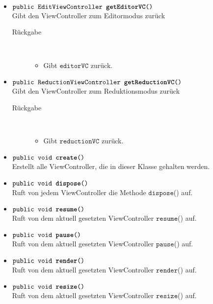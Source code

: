 \begin{description}
\begin{itemize}
		\item $\texttt{public EditViewController \textbf{getEditorVC}()}$ \\ Gibt den ViewController zum Editormodus zurück
			\begin{description}
			\item[Rückgabe] \hfill \\
			\vspace{-.8cm}
			\begin{itemize}
				\item Gibt $\texttt{editorVC}$ zurück.
			\end{itemize}
		\end{description}
		
		\item $\texttt{public ReductionViewController \textbf{getReductionVC}()}$ \\ Gibt den ViewController zum Reduktionsmodus zurück
			\begin{description}
			\item[Rückgabe] \hfill \\
			\vspace{-.8cm}
			\begin{itemize}
				\item Gibt $\texttt{reductionVC}$ zurück.
			\end{itemize}
		\end{description}

		\item $\texttt{public void \textbf{create}()}$ \\ Erstellt alle ViewController, die in dieser Klasse gehalten werden.
		\item $\texttt{public void \textbf{dispose}()}$ \\ Ruft von jedem ViewController die Methode $\texttt{dispose}$() auf.
		\item $\texttt{public void \textbf{resume}()}$ \\ Ruft von dem aktuell gesetzten ViewController $\texttt{resume}$() auf.
		\item $\texttt{public void \textbf{pause}()}$ \\ Ruft von dem aktuell gesetzten ViewController $\texttt{pause}$() auf.
		\item $\texttt{public void \textbf{render}()}$ \\ Ruft von dem aktuell gesetzten ViewController $\texttt{render}$() auf.
		\item $\texttt{public void \textbf{resize}()}$ \\ Ruft von dem aktuell gesetzten ViewController $\texttt{resize}$() auf.
		

			

		\end{itemize}
	\end{description}
	
